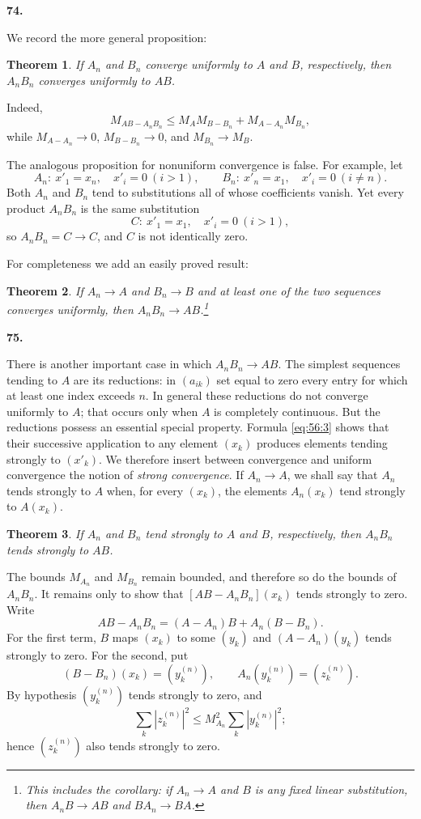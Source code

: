 \documentclass[
  paper=b5,
  fontsize=13pt,
  twoside=true,
  open=any,
  bookmarkpackage=false,
  chapterprefix=true,
  headings=normal
]{scrbook}
\newtheorem*{theorem}{Theorem}
\theoremstyle{definition}
\newcommand{\numberedparagraph}[1]{%
  \par\medskip\phantomsection\label{sec:#1}%
  \noindent\textbf{#1.}\enspace
}
\begin{document}
\numberedparagraph{74}
We record the more general proposition:
\begin{theorem}
If $A_n$ and $B_n$ converge uniformly to $A$ and $B$, respectively, then
$A_nB_n$ converges uniformly to $AB$.
\end{theorem}
Indeed,
\[
 M_{AB-A_nB_n}
 \leq M_A M_{B-B_n}+M_{A-A_n}M_{B_n},
\]
while $M_{A-A_n}\to0$, $M_{B-B_n}\to0$, and $M_{B_n}\to M_B$.

The analogous proposition for nonuniform convergence is false. For
example, let
\[
 A_n:\ x'_1=x_n,\quad x'_i=0\ (i>1),
 \qquad
 B_n:\ x'_n=x_1,\quad x'_i=0\ (i\neq n).
\]
Both $A_n$ and $B_n$ tend to substitutions all of whose coefficients
vanish. Yet every product $A_nB_n$ is the same substitution
\[
 C:\ x'_1=x_1,\quad x'_i=0\ (i>1),
\]
so $A_nB_n=C\to C$, and $C$ is not identically zero.

For completeness we add an easily proved result:
\begin{theorem}
If $A_n\to A$ and $B_n\to B$ and at least one of the two sequences
converges uniformly, then $A_nB_n\to AB$.\footnote{This includes the
corollary: if $A_n\to A$ and $B$ is any fixed
linear substitution, then $A_nB\to AB$ and $BA_n\to BA$.}
\end{theorem}

\numberedparagraph{75}
There is another important case in which $A_nB_n\to AB$. The simplest
sequences tending to $A$ are its reductions: in $(a_{ik})$ set equal to
zero every entry for which at least one index exceeds $n$. In general these
reductions do not converge uniformly to $A$; that occurs only when $A$ is
completely continuous. But the reductions possess an essential special
property.
Formula \eqref{eq:56:3} shows that their successive application to any
element $(x_k)$ produces elements tending strongly to $(x'_k)$. We
therefore insert between convergence and uniform convergence the notion of
\emph{strong convergence}. If $A_n\to A$, we shall say that $A_n$ tends
strongly to $A$ when, for every $(x_k)$, the elements $A_n(x_k)$ tend
strongly to $A(x_k)$.

\begin{theorem}
If $A_n$ and $B_n$ tend strongly to $A$ and $B$, respectively, then
$A_nB_n$ tends strongly to $AB$.
\end{theorem}

The bounds $M_{A_n}$ and $M_{B_n}$ remain bounded, and therefore so do the
bounds of $A_nB_n$. It remains only to show that
$[AB-A_nB_n](x_k)$ tends strongly to zero. Write
\[
 AB-A_nB_n=(A-A_n)B+A_n(B-B_n).
\]
For the first term, $B$ maps $(x_k)$ to some $(y_k)$ and
$(A-A_n)(y_k)$ tends strongly to zero. For the second, put
\[
 (B-B_n)(x_k)=(y_k^{(n)}),
 \qquad
 A_n(y_k^{(n)})=(z_k^{(n)}).
\]
By hypothesis $(y_k^{(n)})$ tends strongly to zero, and
\[
 \sum_k|z_k^{(n)}|^2\leq M_{A_n}^2\sum_k|y_k^{(n)}|^2;
\]
hence $(z_k^{(n)})$ also tends strongly to zero.
\end{document}
